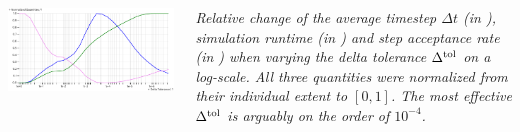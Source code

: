 \documentclass[25pt, a0paper, portrait, colspace=8mm]{tikzposter}
\begin{document}
\begin{columns}
{      \includegraphics[width=\linewidth]{../../figures/results/delta-tolerance.pdf}

      \textit{Relative change of the average timestep $\Delta t$ (in ), simulation runtime (in ) and step acceptance rate (in ) when varying the delta tolerance $\Delta^{\rm tol}$ on a log-scale. All three quantities were normalized from their individual extent to $[0, 1]$. The most effective $\Delta^{\rm tol}$ is arguably on the order of $10^{-4}$.}
      \vspace*{-1.0cm}
    }


\end{columns}
\end{document}

